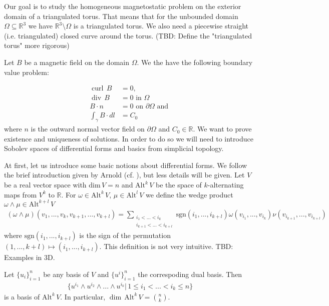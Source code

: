\documentclass[12pt,a4paper]{article}
\theoremstyle{definition}
\DeclareMathOperator{\curl}{curl}
\DeclareMathOperator{\diver}{div}
\newcommand{\alternating}[2]{ {\text{Alt}^{#1}\,#2} }
\newcommand{\real}{\mathbb{R}}
\begin{document}
Our goal is to study the homogeneous magnetostatic problem on the exterior 
domain of a triangulated torus. That means 
that for the unbounded domain  $\Omega \subseteq \real^3$ we have
$\real^3 \setminus \Omega$ is a triangulated torus. We also need a 
piecewise straight (i.e. triangulated) closed curve around the torus.
{\color{red} (TBD: Define the "triangulated torus" more rigorous)}

Let $B$ be a magnetic field on the domain $\Omega$.
We the have the following boundary value problem:

\begin{align}
    \curl \, B &= 0, \\ 
    \diver \, B  &= 0 \text{ in } \Omega \\
    B \cdot n &= 0 \text{ on } \partial \Omega \text{ and }\\
    \int_\gamma B \cdot dl &= C_0
\end{align}
where $n$ is the outward normal vector field on $\partial \Omega$ and 
$C_0 \in \real$. We want to prove existence and uniqueness of 
solutions. In order to do so we will need to introduce Sobolev spaces of 
differential forms and basics from
simplicial topology.

At first, let us introduce some basic notions about differential forms. 
We follow the brief introduction given by Arnold (cf. \cite[Sec. 6.1]{arnold}), 
but less details will be given. 
Let $V$ be a real vector space with $\text{dim}\,V = n$ 
    and $\text{Alt}^k\,V$ be the 
space of $k$-alternating maps from $V^k$ to $\real$. For $\omega \in 
\alternating{k}{V}$, $\mu \in 
\alternating{l}{V}$ we define the wedge product $\omega \wedge \mu \in 
\alternating{k+l}{V}$ 
\begin{align*}
    (\omega \wedge \mu) (v_1,...,v_k,v_{k+1},...,v_{k+l}) =
    \sum\limits_{\substack{i_1 < ... < i_k \\ i_{k+1} < ... < i_{k+l}}}
    \text{sgn}(i_1,...,i_{k+l}) \omega(v_{i_1},...,v_{i_k}) 
    \nu(v_{i_{k+1}},...,v_{i_{k+l}})
\end{align*}
where $\text{sgn}(i_1,...,i_{k+l})$ is the sign of the permutation 
$(1,...,k+l) \mapsto (i_1,...,i_{k+l})$. This definition is not very intuitive.
{\color{red} TBD: Examples in 3D}.

Let $\{ u_i\}_{i=1}^n$ be any basis of $V$ and $\{ u^i\}_{i=1}^n$ the 
correspoding dual basis. Then 
\begin{align*}
    \{u^{i_1} \wedge u^{i_2} \wedge ... \wedge u^{i_k} | \, 
    1 \leq i_1 < ... < i_k \leq n \}
\end{align*}
is a basis of $\alternating{k}{V}$. In particular, 
$\dim\, \alternating{k}{V} = \binom{n}{k}$.
\end{document}
